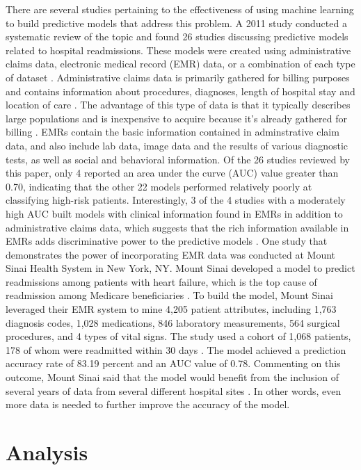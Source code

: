 \documentclass[sigconf]{acmart}
\begin{document}
There are several studies pertaining to the effectiveness of using machine learning to build predictive models that address this problem. A 2011 study conducted a systematic review of the topic and found 26 studies discussing predictive models related to hospital readmissions. These models were created using administrative claims data, electronic medical record (EMR) data, or a combination of each type of dataset \cite{cite08}. Administrative claims data is primarily gathered for billing purposes and contains information about procedures, diagnoses, length of hospital stay and location of care \cite{cite10}. The advantage of this type of data is that it typically describes large populations and is inexpensive to acquire because it's already gathered for billing \cite{cite05}. EMRs contain the basic information contained in adminstrative claim data, and also include lab data, image data and the results of various diagnostic tests, as well as social and behavioral information. Of the 26 studies reviewed by this paper, only 4 reported an area under the curve (AUC) value greater than 0.70, indicating that the other 22 models performed relatively poorly at classifying high-risk patients. Interestingly, 3 of the 4 studies with a moderately high AUC built models with clinical information found in EMRs in addition to administrative claims data, which suggests that the rich information available in EMRs adds discriminative power to the predictive models \cite{cite05}.
One study that demonstrates the power of incorporating EMR data was conducted at Mount Sinai Health System in New York, NY. Mount Sinai developed a model to predict readmissions among patients with heart failure, which is the top cause of readmission among Medicare beneficiaries \cite{cite01}. To build the model, Mount Sinai leveraged their EMR system to mine 4,205 patient attributes, including 1,763 diagnosis codes, 1,028 medications, 846 laboratory measurements, 564 surgical procedures, and 4 types of vital signs. The study used a cohort of 1,068 patients, 178 of whom were readmitted within 30 days \cite{cite01}. The model achieved a prediction accuracy rate of 83.19 percent and an AUC value of 0.78. Commenting on this outcome, Mount Sinai said that the model would benefit from the inclusion of several years of data from several different hospital sites \cite{cite01}. In other words, even more data is needed to further improve the accuracy of the model.

\section{Analysis}
\end{document}
